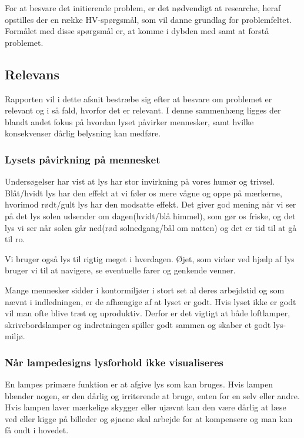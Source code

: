 For at besvare det initierende problem, er det nødvendigt at researche, heraf opstilles der en række HV-spørgsmål, som vil danne grundlag for problemfeltet. Formålet med disse spørgsmål er, at komme i dybden med samt at forstå problemet.

\subsection{Relevans}
Rapporten vil i dette afsnit bestræbe sig efter at besvare om problemet er relevant og i så fald, hvorfor det er relevant. I denne sammenhæng ligges der blandt andet fokus på hvordan lyset påvirker mennesker, samt hvilke konsekvenser dårlig belysning kan medføre. 

\subsubsection{Lysets påvirkning på mennesket}

Undersøgelser har vist at lys har stor invirkning på vores humør og trivsel.
Blåt/hvidt lys har den effekt at vi føler os mere vågne og oppe på mærkerne, hvorimod rødt/gult lys har den modsatte effekt\cite{videnskab_dk_paavirkning}. Det giver god mening når vi ser på det lys solen udsender om dagen(hvidt/blå himmel), som gør os friske, og det lys vi ser når solen går ned(rød solnedgang/bål om natten) og det er tid til at gå til ro. 

Vi bruger også lys til rigtig meget i hverdagen. Øjet, som virker ved hjælp af lys bruger vi til at navigere, se eventuelle farer og genkende venner.

Mange mennesker sidder i kontormiljøer i stort set al deres arbejdstid og som nævnt i indledningen, er de afhængige af at lyset er godt. Hvis lyset ikke er godt vil man ofte blive træt og uproduktiv. Derfor er det vigtigt at både loftlamper, skrivebordslamper og indretningen spiller godt sammen og skaber et godt lys-miljø.


\subsubsection{Når lampedesigns lysforhold ikke visualiseres}

En lampes primære funktion er at afgive lys som kan bruges. Hvis lampen blænder nogen, er den dårlig og irriterende at bruge, enten for en selv eller andre. Hvis lampen laver mærkelige skygger eller ujævnt kan den være dårlig at læse ved eller kigge på billeder og øjnene skal arbejde for at kompensere og man kan få ondt i hovedet\cite{lys_konsekvenser}.

